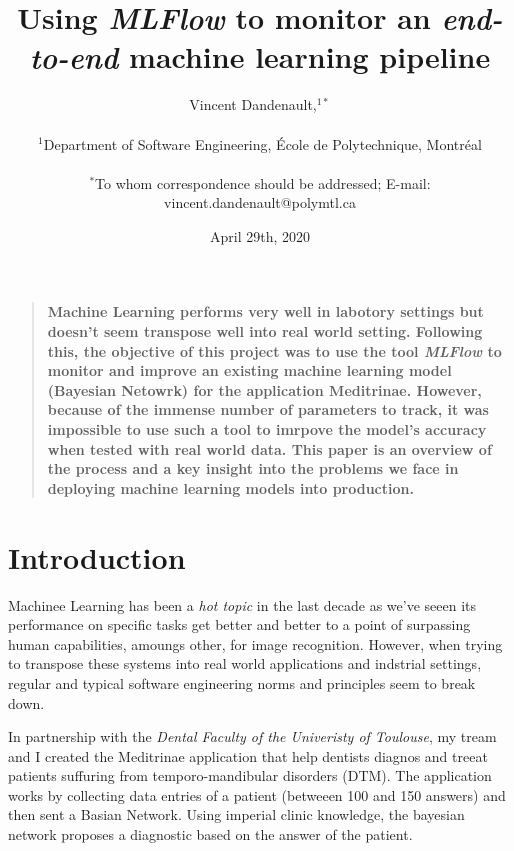 \documentclass[12pt]{article}
\title{Using \textit{MLFlow} to monitor an \textit{end-to-end} machine learning pipeline}
\author
{Vincent Dandenault,$^{1\ast}$ \\
\\
\normalsize{$^{1}$Department of Software Engineering, École de Polytechnique, Montréal}\\
\\
\normalsize{$^\ast$To whom correspondence should be addressed; E-mail: vincent.dandenault@polymtl.ca}
}
\date{April 29th, 2020}
\newenvironment{sciabstract}{%
\begin{quote} \bf}
{\end{quote}}
\begin{document}
 


\baselineskip24pt


\maketitle 




\begin{sciabstract}
Machine Learning performs very well in labotory settings but doesn't seem transpose well into real world setting. Following this, the objective of this project was to use the tool \textit{MLFlow} to monitor and improve an existing machine learning model (Bayesian Netowrk) for the application Meditrinae. However, because of the immense number of parameters to track, it was impossible to use such a tool to imrpove the model's accuracy when tested with real world data. This paper is an overview of the process and a key insight into the problems we face in deploying machine learning models into production. 
  
\end{sciabstract}


\section*{Introduction}

Machinee Learning has been a \textit{hot topic} in the last decade as we've seeen its performance on specific tasks get better and better to a point of surpassing human capabilities, amoungs other, for image recognition. However, when trying to transpose these systems into real world applications and indstrial settings, regular and typical software engineering norms and principles seem to break down. 

In partnership with the \textit{Dental Faculty of the Univeristy of Toulouse}, my tream and I created the Meditrinae application that help dentists diagnos and treeat patients suffuring from temporo-mandibular disorders (DTM). The application works by collecting data entries of a patient (betweeen 100 and 150 answers) and then sent a Basian Network. Using imperial clinic knowledge, the bayesian network proposes a diagnostic based on the answer of the patient. 
\end{document}
